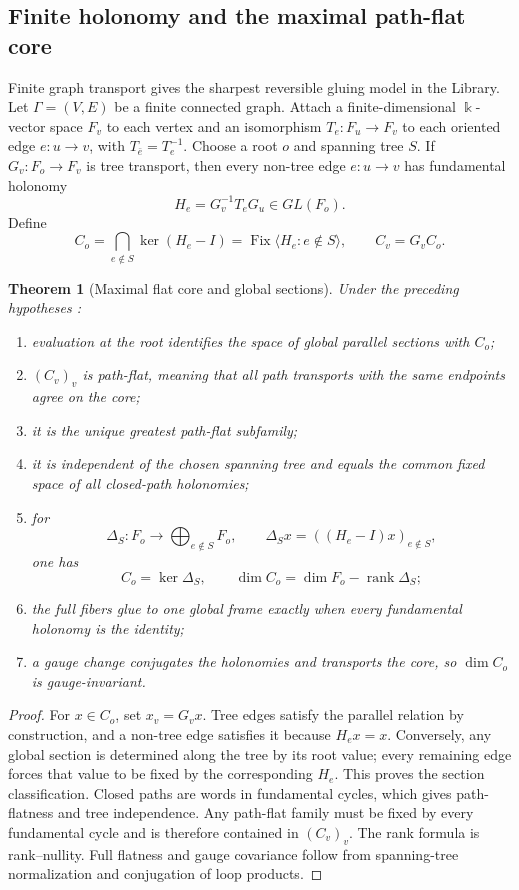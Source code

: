 \documentclass[11pt]{article}
\newtheorem{theorem}{Theorem}[section]
\theoremstyle{definition}
\theoremstyle{remark}
\DeclareMathOperator{\Fix}{Fix}
\DeclareMathOperator{\rank}{rank}
\newcommand{\kk}{\Bbbk}
\begin{document}
\subsection{Finite holonomy and the maximal path-flat core}
\label{subsec:maximal-flat-core}

Finite graph transport gives the sharpest reversible gluing model in the Library.  Let \(\Gamma=(V,E)\) be a finite connected graph.  Attach a finite-dimensional \(\kk\)-vector space \(F_v\) to each vertex and an isomorphism \(T_e:F_u\to F_v\) to each oriented edge \(e:u\to v\), with \(T_{\bar e}=T_e^{-1}\).  Choose a root \(o\) and spanning tree \(S\).  If \(G_v:F_o\to F_v\) is tree transport, then every non-tree edge \(e:u\to v\) has fundamental holonomy
\[
H_e=G_v^{-1}T_eG_u\in GL(F_o).
\]
Define
\[
C_o
=
\bigcap_{e\notin S}\ker(H_e-I)
=
\Fix\langle H_e:e\notin S\rangle,
\qquad
C_v=G_vC_o.
\]

\begin{theorem}[Maximal flat core and global sections]
\label{thm:maximal-flat-core}
Under the preceding hypotheses \cite{P3,CT4}:
\begin{enumerate}[label=\textup{(\roman*)}]
\item evaluation at the root identifies the space of global parallel sections with \(C_o\);
\item \((C_v)_v\) is path-flat, meaning that all path transports with the same endpoints agree on the core;
\item it is the unique greatest path-flat subfamily;
\item it is independent of the chosen spanning tree and equals the common fixed space of all closed-path holonomies;
\item for
\[
\Delta_S:F_o\longrightarrow\bigoplus_{e\notin S}F_o,
\qquad
\Delta_Sx=((H_e-I)x)_{e\notin S},
\]
one has
\[
C_o=\ker\Delta_S,
\qquad
\dim C_o=\dim F_o-\rank\Delta_S;
\]
\item the full fibers glue to one global frame exactly when every fundamental holonomy is the identity;
\item a gauge change conjugates the holonomies and transports the core, so \(\dim C_o\) is gauge-invariant.
\end{enumerate}
\end{theorem}

\begin{proof}
For \(x\in C_o\), set \(x_v=G_vx\).  Tree edges satisfy the parallel relation by construction, and a non-tree edge satisfies it because \(H_ex=x\).  Conversely, any global section is determined along the tree by its root value; every remaining edge forces that value to be fixed by the corresponding \(H_e\).  This proves the section classification.  Closed paths are words in fundamental cycles, which gives path-flatness and tree independence.  Any path-flat family must be fixed by every fundamental cycle and is therefore contained in \((C_v)_v\).  The rank formula is rank--nullity.  Full flatness and gauge covariance follow from spanning-tree normalization and conjugation of loop products.
\end{proof}
\end{document}
